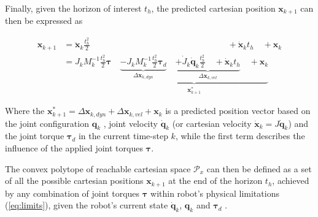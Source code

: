 Finally, given the horizon of interest $t_h$, the predicted cartesian position $\bm{x}_{k+1}$ can then be expressed as

\begin{equation}
\begin{split}
    {\bm{x}}_{k+1} &= \ddot{\bm{x}}_k\frac{t_h^2}{2}   \qquad\qquad\qquad\qquad\qquad\qquad\qquad\qquad+\dot{\bm{x}}_kt_h \quad +\!  \bm{x}_k\\
    &=  J_k M_k^{-1}\frac{t_h^2}{2}\bm{\tau} \quad \underbrace{\underbrace{-
    J_k M_k^{-1}\frac{t_h^2}{2}\bm{\tau}_d}_{\Delta \bm{x}_{k,dyn}}  \quad \underbrace{ +\dot{J}_k \dot{\bm{q}}_k\frac{t_h^2}{2} \quad+ \dot{\bm{x}}_kt_h}_{\Delta \bm{x}_{k,vel}} \quad + \bm{x}_{k} }_{\bm{x}^*_{k+1}}
    \end{split}
    \label{eq:pred_pos}
\end{equation}

Where the $\bm{x}^*_{k+1}\! =\!\Delta \bm{x}_{k,dyn}\! +\! \Delta \bm{x}_{k,vel} + \bm{x}_{k}$ is a predicted position vector based on the joint configuration $\bm{q}_k$ , joint velocity $\dot{\bm{q}}_k$ (or cartesian velocity  $\dot{\bm{x}}_k\!=\!J\dot{\bm{q}}_k$) and the joint torque $\bm{\tau}_d$ in the current time-step $k$, while the first term describes the influence of the applied joint torques $\bm{\tau}$.

The convex polytope of reachable cartesian space $\mathcal{P}_x$ can then be defined as a set of all the possible cartesian positions $\bm{x}_{k+1}$ at the end of the horizon $t_h$, achieved by any combination of joint torques $\bm{\tau}$ within robot's physical limitations (\ref{eq:limits}), given the robot's current state $\dot{\bm{q}}_k$, $\bm{q}_k$ and $\bm{\tau}_d$ .

